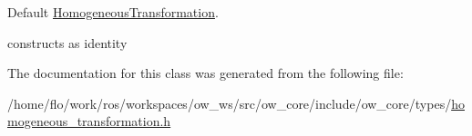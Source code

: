 Default \hyperlink{classow__core_1_1HomogeneousTransformation}{Homogeneous\+Transformation}. 

constructs as identity 

The documentation for this class was generated from the following file\+:\begin{DoxyCompactItemize}
\item 
/home/flo/work/ros/workspaces/ow\+\_\+ws/src/ow\+\_\+core/include/ow\+\_\+core/types/\hyperlink{homogeneous__transformation_8h}{homogeneous\+\_\+transformation.\+h}\end{DoxyCompactItemize}
